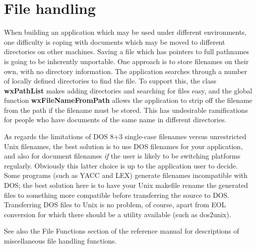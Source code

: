 \section{File handling}

When building an application which may be used under different
environments, one difficulty is coping with documents which may be
moved to different directories on other machines. Saving a file which
has pointers to full pathnames is going to be inherently unportable. One
approach is to store filenames on their own, with no directory
information.  The application searches through a number of locally
defined directories to find the file. To support this, the class {\bf
wxPathList} makes adding directories and searching for files easy, and
the global function {\bf wxFileNameFromPath} allows the application to
strip off the filename from the path if the filename must be stored.
This has undesirable ramifications for people who have documents of the
same name in different directories.

As regards the limitations of DOS 8+3 single-case filenames versus
unrestricted Unix filenames, the best solution is to use DOS filenames
for your application, and also for document filenames {\it if} the user
is likely to be switching platforms regularly. Obviously this latter
choice is up to the application user to decide.  Some programs (such as
YACC and LEX) generate filenames incompatible with DOS; the best
solution here is to have your Unix makefile rename the generated files
to something more compatible before transferring the source to DOS.
Transferring DOS files to Unix is no problem, of course, apart from EOL
conversion for which there should be a utility available (such as
dos2unix).

See also the File Functions section of the reference manual for
descriptions of miscellaneous file handling functions.

